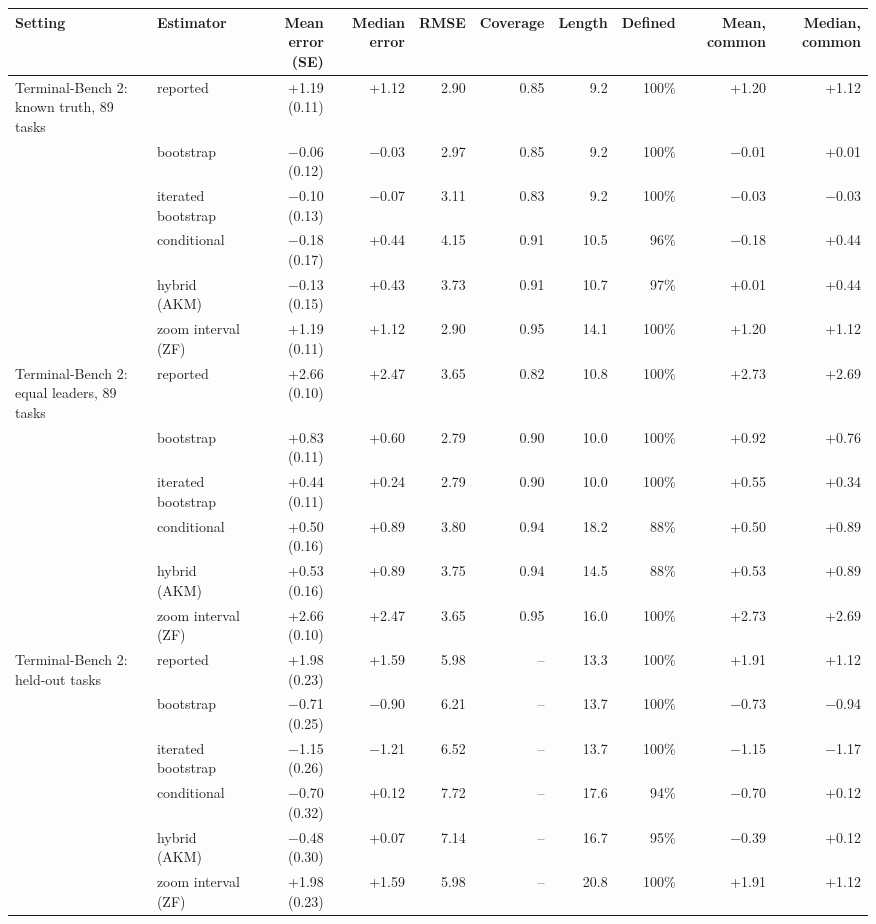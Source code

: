 \begin{tabular}{llrrrrrrrr}
\toprule
Setting & Estimator & Mean error (SE) & Median error & RMSE & Coverage & Length & Defined & Mean, common & Median, common \\
\midrule
Terminal-Bench 2: known truth, 89 tasks & reported & +1.19 (0.11) & +1.12 & 2.90 & 0.85 & 9.2 & 100\% & +1.20 & +1.12 \\
 & bootstrap & $-$0.06 (0.12) & $-$0.03 & 2.97 & 0.85 & 9.2 & 100\% & $-$0.01 & +0.01 \\
 & iterated bootstrap & $-$0.10 (0.13) & $-$0.07 & 3.11 & 0.83 & 9.2 & 100\% & $-$0.03 & $-$0.03 \\
 & conditional & $-$0.18 (0.17) & +0.44 & 4.15 & 0.91 & 10.5 & 96\% & $-$0.18 & +0.44 \\
 & hybrid (AKM) & $-$0.13 (0.15) & +0.43 & 3.73 & 0.91 & 10.7 & 97\% & +0.01 & +0.44 \\
 & zoom interval (ZF) & +1.19 (0.11) & +1.12 & 2.90 & 0.95 & 14.1 & 100\% & +1.20 & +1.12 \\
\addlinespace
Terminal-Bench 2: equal leaders, 89 tasks & reported & +2.66 (0.10) & +2.47 & 3.65 & 0.82 & 10.8 & 100\% & +2.73 & +2.69 \\
 & bootstrap & +0.83 (0.11) & +0.60 & 2.79 & 0.90 & 10.0 & 100\% & +0.92 & +0.76 \\
 & iterated bootstrap & +0.44 (0.11) & +0.24 & 2.79 & 0.90 & 10.0 & 100\% & +0.55 & +0.34 \\
 & conditional & +0.50 (0.16) & +0.89 & 3.80 & 0.94 & 18.2 & 88\% & +0.50 & +0.89 \\
 & hybrid (AKM) & +0.53 (0.16) & +0.89 & 3.75 & 0.94 & 14.5 & 88\% & +0.53 & +0.89 \\
 & zoom interval (ZF) & +2.66 (0.10) & +2.47 & 3.65 & 0.95 & 16.0 & 100\% & +2.73 & +2.69 \\
\addlinespace
Terminal-Bench 2: held-out tasks & reported & +1.98 (0.23) & +1.59 & 5.98 & -- & 13.3 & 100\% & +1.91 & +1.12 \\
 & bootstrap & $-$0.71 (0.25) & $-$0.90 & 6.21 & -- & 13.7 & 100\% & $-$0.73 & $-$0.94 \\
 & iterated bootstrap & $-$1.15 (0.26) & $-$1.21 & 6.52 & -- & 13.7 & 100\% & $-$1.15 & $-$1.17 \\
 & conditional & $-$0.70 (0.32) & +0.12 & 7.72 & -- & 17.6 & 94\% & $-$0.70 & +0.12 \\
 & hybrid (AKM) & $-$0.48 (0.30) & +0.07 & 7.14 & -- & 16.7 & 95\% & $-$0.39 & +0.12 \\
 & zoom interval (ZF) & +1.98 (0.23) & +1.59 & 5.98 & -- & 20.8 & 100\% & +1.91 & +1.12 \\

\end{tabular}
